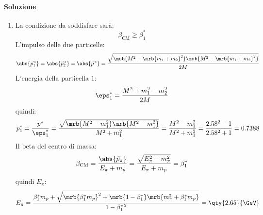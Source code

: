 \begin{example}[]
	\paragraph{Soluzione}
	\begin{enumerate}
		\item La condizione da soddisfare sarà:
		      \begin{equation}
			      \beta _\text{CM} \geq \beta _{1}^{\ast}
		      \end{equation}
		      L'impulso delle due particelle:
		      \begin{equation}
			      \abs{\vec{p}_{1}^{\,\ast}}
			      = \abs{\vec{p}_{2}^{\,\ast}}
			      = \abs{\vec{p}^{\,\ast}}
			      = \frac{\sqrt{\msb{M^2 - \mrb{m_1 + m_2}^{2}}
					      \msb{M^2 - \mrb{m_1 + m_2}^{2}}}}{2M}
		      \end{equation}
		      L'energia della particella $1$:
		      \begin{equation}
			      \eps _{1}^{\ast} = \frac{M^2 + m_1^2 - m_2^2}{2M}
		      \end{equation}
		      quindi:
		      \begin{equation}
			      p_1^\ast
			      = \frac{p ^{\ast}}{\eps _{1}^{\ast}}
			      = \frac{\sqrt{\mrb{M^2 - m_1^2} \mrb{M^2 - m_1^2}}}{M^2 + m_1^2}
			      = \frac{M^2 - m_1^2}{M^2 + m_1^2}
			      = \frac{2.58^2 - 1}{2.58^2 + 1}
			      = 0.7388
		      \end{equation}
		      Il beta del centro di massa:
		      \begin{equation}
			      \beta _\text{CM}
			      = \frac{\abs{\vec{p} _{\pi}}}{E _{\pi} + m_p}
			      = \frac{\sqrt{E^2 _{\pi} - m _{\pi}^{2}}}{E _{\pi} + m_p}
			      = \beta_1^\ast
		      \end{equation}
		      quindi $E _{\pi}$:
		      \begin{equation}
			      E _{\pi}
			      = \frac{
				      \beta _{1}^{\ast} m_p
				      + \sqrt{\mrb{\beta_1^\ast m_p}^{2}
					      + \mrb{1 - \beta_1^\ast} \mrb{
						      m _{\pi}^{2} + \beta_1 ^{\ast} m_p}
				      }}{1 - \beta_1 ^{\ast\,2}}
			      = \qty{2.65}{\GeV}
		      \end{equation}


\end{enumerate}
\end{example}
